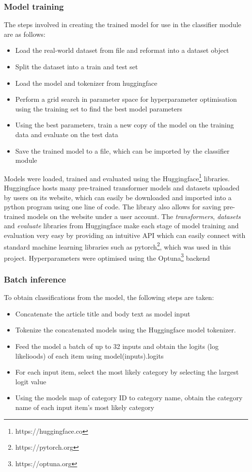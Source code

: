 \documentclass{l4proj}
\begin{document}
\subsubsection{Model training} \hfill \par
    The steps involved in creating the trained model for use in the classifier module are as follows:
    \begin{itemize}
        \item Load the real-world dataset from file and reformat into a dataset object
        \item Split the dataset into a train and test set
        \item Load the model and tokenizer from huggingface
        \item Perform a grid search in parameter space for hyperparameter optimisation using the training set to find the best model parameters
        \item Using the best parameters, train a new copy of the model on the training data and evaluate on the test data
        \item Save the trained model to a file, which can be imported by the classifier module
    \end{itemize}
    Models were loaded, trained and evaluated using the Huggingface\footnote{https://huggingface.co} libraries. Huggingface hosts many pre-trained transformer models and datasets uploaded by users on its website, which can easily be downloaded and imported into a python program using one line of code. The library also allows for saving pre-trained models on the website under a user account. The \emph{transformers}, \emph{datasets} and \emph{evaluate} libraries from Huggingface make each stage of model training and evaluation very easy by providing an intuitive API which can easily connect with standard machine learning libraries such as pytorch\footnote{https://pytorch.org}, which was used in this project. Hyperparameters were optimised using the Optuna\footnote{https://optuna.org} backend\par
    
\subsubsection{Batch inference} \hfill \par
    To obtain classifications from the model, the following steps are taken:
    \begin{itemize}
        \item Concatenate the article title and body text as model input
        \item Tokenize the concatenated models using the Huggingface model tokenizer.
        \item Feed the model a batch of up to 32 inputs and obtain the logits (log likelioods) of each item using model(inputs).logits
        \item For each input item, select the most likely category by selecting the largest logit value
        \item Using the models map of category ID to category name, obtain the category name of each input item's most likely category
    \end{itemize}
\end{document}
